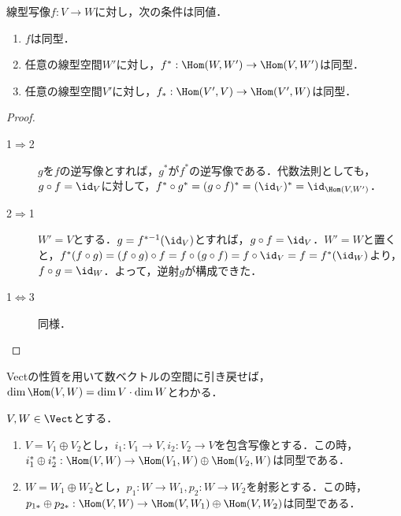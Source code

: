 \documentclass[uplatex, dvipdfmx]{jsreport}
\begin{document}
\begin{corollary}[同型の普遍性]\label{cor-characterization-of-isomorphism}
    線型写像$f:V\to W$に対し，次の条件は同値．
    \begin{enumerate}
        \item $f$は同型．
        \item 任意の線型空間$W'$に対し，$f^*:\Hom(W,W')\to\Hom(V,W')$は同型．
        \item 任意の線型空間$V'$に対し，$f_*:\Hom(V',V)\to\Hom(V',W)$は同型．
    \end{enumerate}
\end{corollary}
\begin{proof}\mbox{}
    \begin{description}
        \item[1$\Rightarrow$2] $g$を$f$の逆写像とすれば，$g^*$が$f^*$の逆写像である．代数法則としても，$g\circ f=\id_V$に対して，$f^*\circ g^*=(g\circ f)^*=(\id_V)^*=\id_{\Hom(V,W')}$．
        \item[2$\Rightarrow$1] $W'=V$とする．$g=f^{*-1}(\id_V)$とすれば，$g\circ f=\id_V$．$W'=W$と置くと，$f^*(f\circ g)=(f\circ g)\circ f=f\circ(g\circ f)=f\circ\id_V=f=f^*(\id_W)$より，$f\circ g=\id_W$．よって，逆射$g$が構成できた．
        \item[1$\Leftrightarrow$3] 同様．
    \end{description}
\end{proof}

\begin{example}[Hom集合の次元は特別なHom集合に引き戻して定める]
    Vectの性質を用いて数ベクトルの空間に引き戻せば，$\dim\Hom(V,W)=\dim V\cdot\dim W$とわかる．
\end{example}

\begin{example}[$V$-値点]
    
\end{example}

\begin{proposition}[直和の普遍性]\label{prop-characterization-of-direct-sum}
    $V,W\in\Vect$とする．
    \begin{enumerate}
        \item $V=V_1\oplus V_2$とし，$i_1:V_1\to V,i_2:V_2\to V$を包含写像とする．この時，$i^*_1\oplus i^*_2:\Hom(V,W)\to\Hom(V_1,W)\oplus\Hom(V_2,W)$は同型である．
        \item $W=W_1\oplus W_2$とし，$p_1:W\to W_1,p_2:W\to W_2$を射影とする．この時，$p_{1*}\oplus p_{2*}:\Hom(V,W)\to\Hom(V,W_1)\oplus\Hom(V,W_2)$は同型である．
    \end{enumerate}
\end{proposition}
\end{document}
